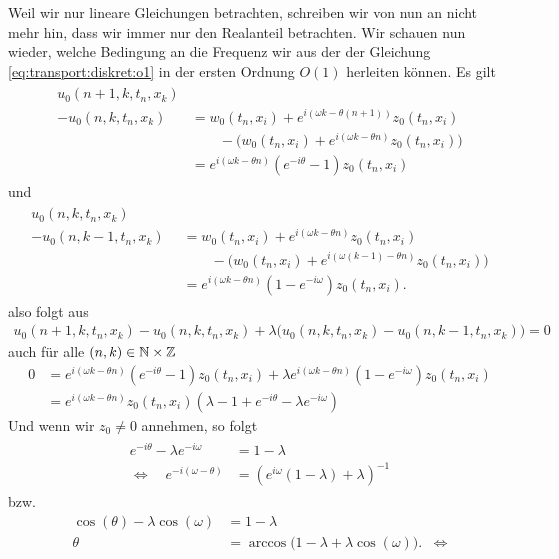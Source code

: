 Weil wir nur lineare Gleichungen betrachten, schreiben wir von nun an nicht mehr hin, dass wir immer nur den Realanteil betrachten.
Wir schauen nun wieder, welche Bedingung an die Frequenz wir aus der der Gleichung \eqref{eq:transport:diskret:o1} in der ersten Ordnung $O(1)$ herleiten können.
Es gilt
\begin{align}\begin{split}
u_0(n+1,k,t_n,x_k)&\qquad\quad\\
- u_0(n,k,t_n,x_k) &= w_0(t_n,x_i) + e^{i (\omega k - \theta (n+1))} z_0(t_n,x_i)\\
    &\qquad - \bigl( w_0(t_n,x_i) + e^{i (\omega k - \theta n)} z_0(t_n,x_i) \bigr)\\
&= e^{i (\omega k - \theta n)} (e^{-i\theta} - 1) z_0(t_n,x_i)
\end{split}\end{align}
und
\begin{align}\begin{split}
u_0(n,k,t_n,x_k)\qquad \quad &\\
- u_0(n,k-1,t_n,x_k) &= w_0(t_n,x_i) + e^{i (\omega k - \theta n)} z_0(t_n,x_i)\\
& \qquad - \bigl( w_0(t_n,x_i) + e^{i (\omega (k-1) - \theta n)} z_0(t_n,x_i) \bigr)\\
&= e^{i (\omega k - \theta n)} (1 - e^{-i \omega}) z_0(t_n,x_i).
\end{split}\end{align}
also folgt aus
\begin{align*}
u_0(n+1,k,t_n,x_k) - u_0(n,k,t_n,x_k) + \lambda \bigl(u_0(n,k,t_n,x_k) - u_0(n,k-1,t_n,x_k) \bigr) = 0
\end{align*}
auch für alle $(n, k) \in \mathbb N \times \mathbb Z$
\begin{align}
0 &= e^{i (\omega k - \theta n)} (e^{-i\theta} - 1) z_0(t_n,x_i) + \lambda e^{i (\omega k - \theta n)} (1 - e^{-i \omega}) z_0(t_n,x_i)\\
&= e^{i (\omega k - \theta n)} z_0(t_n,x_i) ( \lambda - 1 + e^{-i\theta} - \lambda e^{-i \omega} )
\end{align}
Und wenn wir $z_0 \neq 0$ annehmen, so folgt
\begin{align}\label{eq:wkb:gl1}
\begin{split}
e^{-i \theta} - \lambda e^{-i \omega} &= 1 - \lambda\\
\Leftrightarrow \quad e^{-i (\omega - \theta)} &= \left( e^{i \omega} (1 -  \lambda) + \lambda \right)^{-1}
\end{split}
\end{align}
bzw.
\begin{align*}
\cos(\theta) - \lambda \cos(\omega) &= 1 - \lambda\\
\theta  &=  \arccos\bigl(1 - \lambda + \lambda \cos(\omega) \bigr). &\Leftrightarrow
\end{align*}

